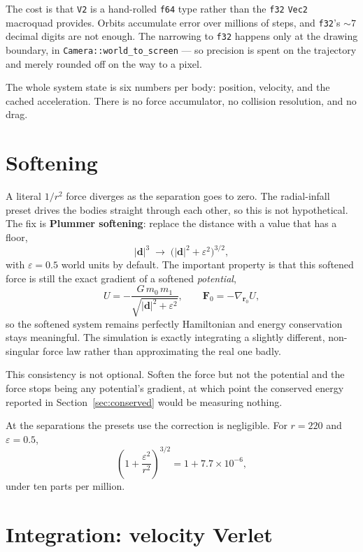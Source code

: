 \documentclass[11pt,a4paper]{article}
\newcommand{\vd}{\mathbf{d}}
\newcommand{\vr}{\mathbf{r}}
\newcommand{\vF}{\mathbf{F}}
\begin{document}
The cost is that \texttt{V2} is a hand-rolled \texttt{f64} type rather than the
\texttt{f32} \texttt{Vec2} macroquad provides. Orbits accumulate error over
millions of steps, and \texttt{f32}'s ${\sim}7$ decimal digits are not enough.
The narrowing to \texttt{f32} happens only at the drawing boundary, in
\texttt{Camera::world\_to\_screen} --- so precision is spent on the trajectory
and merely rounded off on the way to a pixel.

The whole system state is six numbers per body: position, velocity, and the
cached acceleration. There is no force accumulator, no collision resolution, and
no drag.

\section{Softening}
\label{sec:softening}

A literal $1/r^2$ force diverges as the separation goes to zero. The
radial-infall preset drives the bodies straight through each other, so this is
not hypothetical. The fix is \textbf{Plummer softening}: replace the distance
with a value that has a floor,
\[
  |\vd|^{3} \;\longrightarrow\; \bigl(|\vd|^{2} + \varepsilon^{2}\bigr)^{3/2},
\]
with $\varepsilon = 0.5$ world units by default. The important property is that
this softened force is still the exact gradient of a softened \emph{potential},
\[
  U = -\frac{G\,m_0\,m_1}{\sqrt{|\vd|^{2} + \varepsilon^{2}}},
  \qquad
  \vF_0 = -\nabla_{\vr_0} U ,
\]
so the softened system remains perfectly Hamiltonian and energy conservation
stays meaningful. The simulation is exactly integrating a slightly different,
non-singular force law rather than approximating the real one badly.

This consistency is not optional. Soften the force but not the potential and the
force stops being any potential's gradient, at which point the conserved energy
reported in Section~\ref{sec:conserved} would be measuring nothing.

At the separations the presets use the correction is negligible. For
$r = 220$ and $\varepsilon = 0.5$,
\[
  \left(1 + \frac{\varepsilon^{2}}{r^{2}}\right)^{3/2}
  = 1 + 7.7\times10^{-6},
\]
under ten parts per million.

\section{Integration: velocity Verlet}
\label{sec:verlet}
\end{document}

